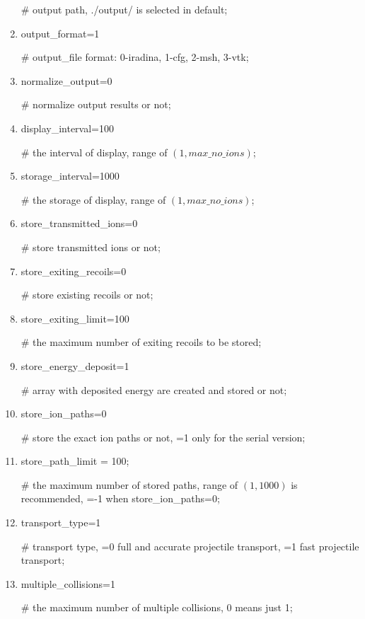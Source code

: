 \begin{enumerate}[1:~]
\# output path, ./output/ is selected in default;

\item output\_format=1

\# output\_file format: 0-iradina, 1-cfg, 2-msh, 3-vtk;

\item normalize\_output=0

\# normalize output results or not;

\item display\_interval=100

\# the interval of display, range of $(1, max\_no\_ions)$;

\item storage\_interval=1000

\# the storage of display, range of $(1, max\_no\_ions)$;

\item store\_transmitted\_ions=0

\# store transmitted ions or not;

\item store\_exiting\_recoils=0

\# store existing recoils or not;

\item store\_exiting\_limit=100

\# the maximum number of exiting recoils to be stored;

\item store\_energy\_deposit=1

\# array with deposited energy are created and stored or not;

\item store\_ion\_paths=0

\# store the exact ion paths or not, =1 only for the serial version;

\item store\_path\_limit = 100;

\# the maximum number of stored paths, range of $(1, 1000)$ is recommended, =-1 when store\_ion\_paths=0;

\item transport\_type=1

\# transport type, =0 full and accurate projectile transport, =1 fast projectile transport;

\item multiple\_collisions=1

\# the maximum number of multiple collisions, 0 means just 1;


\end{enumerate}
